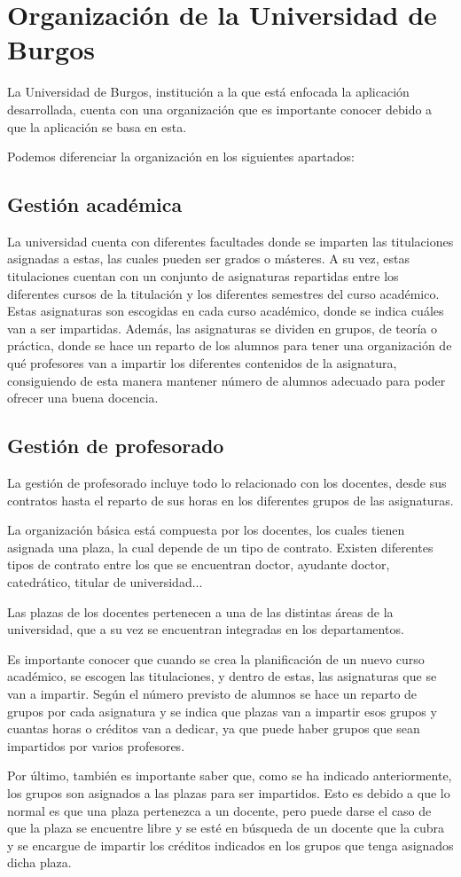 \section{Organización de la Universidad de Burgos}
La Universidad de Burgos, institución a la que está enfocada la aplicación desarrollada, cuenta con una organización  que es importante conocer debido a que la aplicación se basa en esta.
 
Podemos diferenciar la organización en los siguientes apartados:

\subsection{Gestión académica}
La universidad cuenta con diferentes facultades donde se imparten las titulaciones asignadas a estas, las cuales pueden ser grados o másteres.
A su vez, estas titulaciones cuentan con un conjunto de asignaturas repartidas entre los diferentes cursos de la titulación y los diferentes semestres del curso académico. 
Estas asignaturas son escogidas en cada curso académico, donde se indica cuáles van a ser impartidas.
Además, las asignaturas se dividen en grupos, de teoría o práctica, donde se hace un reparto de los alumnos para tener una organización de qué profesores van a impartir los diferentes contenidos de la asignatura, consiguiendo de esta manera mantener número de alumnos adecuado para poder ofrecer una buena docencia.

\subsection{Gestión de profesorado}
La gestión de profesorado incluye todo lo relacionado con los docentes, desde sus contratos hasta el reparto de sus horas en los diferentes grupos de las asignaturas.

La organización básica está compuesta por los docentes, los cuales tienen asignada una plaza, la cual depende de un tipo de contrato. Existen diferentes tipos de contrato entre los que se encuentran doctor, ayudante doctor, catedrático, titular de universidad...

Las plazas de los docentes pertenecen a una de las distintas áreas de la universidad, que a su vez se encuentran integradas en los departamentos.

Es importante conocer que cuando se crea la planificación de un nuevo curso académico, se escogen las titulaciones, y dentro de estas, las asignaturas que se van a impartir. 
Según el número previsto de alumnos se hace un reparto de grupos por cada asignatura y se indica que plazas van a impartir esos grupos y cuantas horas o créditos van a dedicar, ya que puede haber grupos que sean impartidos por varios profesores.

Por último, también es importante saber que, como se ha indicado anteriormente, los grupos son asignados a las plazas para ser impartidos.
Esto es debido a que lo normal es que una plaza pertenezca a un docente, pero puede darse el caso de que la plaza se encuentre libre y se esté en búsqueda de un docente que la cubra y se encargue de impartir los créditos indicados en los grupos que tenga asignados dicha plaza.
